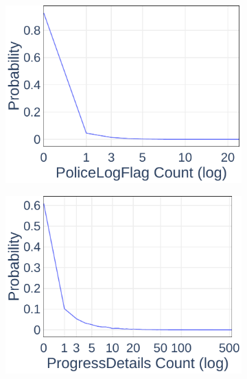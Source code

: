 \begin{figure}[ht]
	\begin{subfigure}[b]{0.3\textwidth}
    \includegraphics[width=\textwidth]{Figures/Data-PoliceLogFlag-PDF}
  \end{subfigure}
	\begin{subfigure}[b]{0.3\textwidth}
    \includegraphics[width=\textwidth]{Figures/Data-ProgressDetails-PDF}
  \end{subfigure}
	\begin{subfigure}[b]{0.3\textwidth}

\end{subfigure}
\end{figure}
